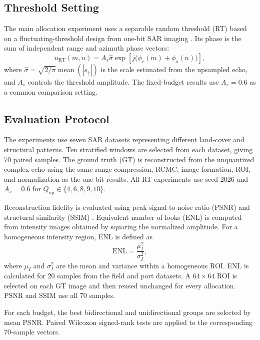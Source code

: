 \documentclass[conference]{IEEEtran}
\begin{document}
\subsection{Threshold Setting}

The main allocation experiment uses a separable random threshold (RT) based on a fluctuating-threshold design from one-bit SAR imaging \cite{nie2025fixed}. Its phase is the sum of independent range and azimuth phase vectors:
\begin{equation}
    u_{\mathrm{RT}}(m,n)
    =A_s\hat{\sigma}\exp\!\left[j\bigl(\phi_r(m)+\phi_a(n)\bigr)\right],
\end{equation}
where $\hat{\sigma}=\sqrt{2/\pi}\operatorname{mean}(|s_{\uparrow}|)$ is the scale estimated from the upsampled echo, and $A_s$ controls the threshold amplitude. The fixed-budget results use $A_s=0.6$ as a common comparison setting.

\subsection{Evaluation Protocol}

The experiments use seven SAR datasets representing different land-cover and structural patterns. Ten stratified windows are selected from each dataset, giving 70 paired samples. The ground truth (GT) is reconstructed from the unquantized complex echo using the same range compression, RCMC, image formation, ROI, and normalization as the one-bit results. All RT experiments use seed 2026 and $A_s=0.6$ for $Q_{\mathrm{up}}\in\{4,6,8,9,10\}$.

Reconstruction fidelity is evaluated using peak signal-to-noise ratio (PSNR) and structural similarity (SSIM) \cite{wang2004ssim}. Equivalent number of looks (ENL) is computed from intensity images obtained by squaring the normalized amplitude. For a homogeneous intensity region, ENL is defined as \cite{feng2015tgv}
\begin{equation}
    \mathrm{ENL}=\frac{\mu_I^2}{\sigma_I^2},
\end{equation}
where $\mu_I$ and $\sigma_I^2$ are the mean and variance within a homogeneous ROI. ENL is calculated for 20 samples from the field and port datasets. A $64\times64$ ROI is selected on each GT image and then reused unchanged for every allocation. PSNR and SSIM use all 70 samples.

For each budget, the best bidirectional and unidirectional groups are selected by mean PSNR. Paired Wilcoxon signed-rank tests \cite{wilcoxon1945ranking} are applied to the corresponding 70-sample vectors.
\end{document}
